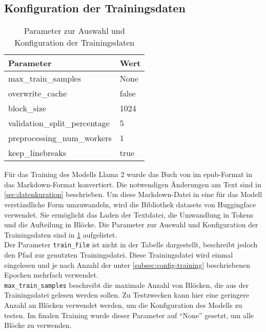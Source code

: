 \subsection{Konfiguration der Trainingsdaten}
\begin{table}
    \centering
    \begin{tabular}{ll}
        \toprule
        \textbf{Parameter}            & \textbf{Wert} \\
        \midrule
        max\_train\_samples           & None          \\
        overwrite\_cache              & false         \\
        block\_size                   & 1024          \\
        validation\_split\_percentage & 5             \\
        preprocessing\_num\_workers   & 1             \\
        keep\_linebreaks              & true          \\
        \bottomrule
    \end{tabular}
    \caption[Parameter zur Konfiguration der Trainingsdaten]{Parameter zur Auswahl und Konfiguration der Trainingsdaten}\label{tab:data-config}
\end{table}
Für das Training des Modells Llama 2 wurde das Buch  von \citet{bb} im epub-Format in das Markdown-Format konvertiert.
Die notwendigen Änderungen am Text sind in \cref{sec:datenkuration} beschrieben.
Um diese Markdown-Datei in eine für das Modell verständliche Form umzuwandeln, wird die Bibliothek datasets \citep{datasets} von Huggingface verwendet.
Sie ermöglicht das Laden der Textdatei, die Umwandlung in Tokens und die Aufteilung in Blöcke.
Die Parameter zur Auswahl und Konfiguration der Trainingsdaten sind in \cref{tab:data-config} aufgelistet.\\

Der Parameter \texttt{train\_file} ist nicht in der Tabelle dargestellt, beschreibt jedoch den Pfad zur genutzten Trainingsdatei.
Diese Trainingsdatei wird einmal eingelesen und je nach Anzahl der unter \cref{subsec:config-training} beschriebenen Epochen mehrfach verwendet.\\

\texttt{max\_train\_samples} beschreibt die maximale Anzahl von Blöcken, die aus der Trainingsdatei gelesen werden sollen.
Zu Testzwecken kann hier eine geringere Anzahl an Blöcken verwendet werden, um die Konfiguration des Modells zu testen.
Im finalen Training wurde dieser Parameter auf \enquote{None} gesetzt, um alle Blöcke zu verwenden.\\


